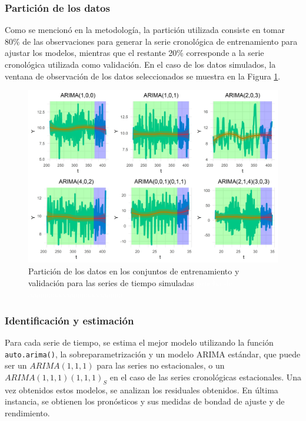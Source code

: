 \documentclass[
]{article}
\begin{document}
\subsubsection{Partición de los datos}

Como se mencionó en la metodología, la partición utilizada consiste en
tomar 80\% de las observaciones para generar la serie cronológica de
entrenamiento para ajustar los modelos, mientras que el restante 20\%
corresponde a la serie cronológica utilizada como validación. En el caso
de los datos simulados, la ventana de observación de los datos
seleccionados se muestra en la Figura
\ref{fig:particion_series_simuladas}.

\begin{figure}[H]
\includegraphics[width=1\linewidth,height=1\textheight]{Tesis_files/figure-latex/particion_series_simuladas-1} \caption{Partición de los datos en los conjuntos de entrenamiento y validación para las series de tiempo simuladas \textcolor{white}{prueba de aaaaaaaaaaaaaaaaaaaaaaa}}\label{fig:particion_series_simuladas}
\end{figure}

\subsubsection{Identificación y estimación}

Para cada serie de tiempo, se estima el mejor modelo utilizando la
función \texttt{auto.arima()}, la sobreparametrización y un modelo ARIMA
estándar, que puede ser un \(ARIMA(1,1,1)\) para las series no
estacionales, o un \(ARIMA(1,1,1)(1,1,1)_S\) en el caso de las series
cronológicas estacionales. Una vez obtenidos estos modelos, se analizan
los residuales obtenidos. En última instancia, se obtienen los
pronósticos y sus medidas de bondad de ajuste y de rendimiento.
\end{document}
